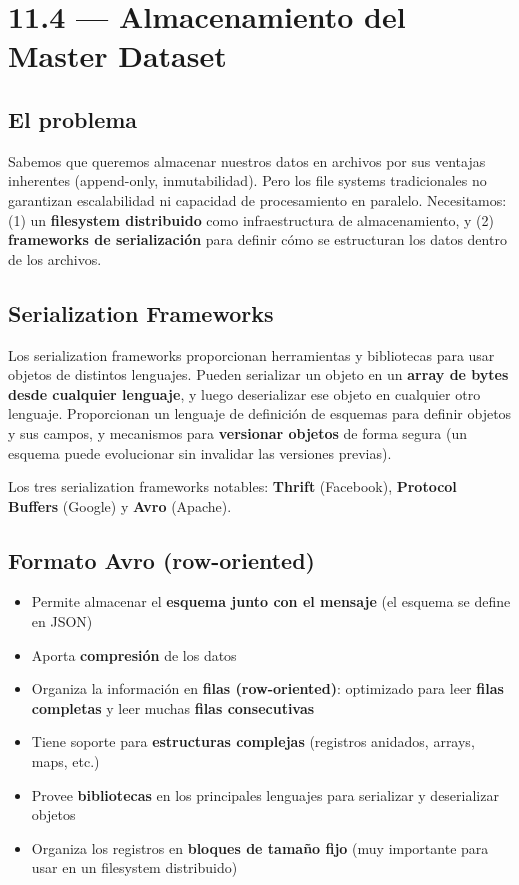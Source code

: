\documentclass[11pt, a4paper]{article}
\begin{document}
\section{11.4 — Almacenamiento del Master Dataset}

\subsection{El problema}

Sabemos que queremos almacenar nuestros datos en archivos por sus ventajas inherentes (append-only, inmutabilidad). Pero los file systems tradicionales no garantizan escalabilidad ni capacidad de procesamiento en paralelo. Necesitamos: (1) un \textbf{filesystem distribuido} como infraestructura de almacenamiento, y (2) \textbf{frameworks de serialización} para definir cómo se estructuran los datos dentro de los archivos.

\subsection{Serialization Frameworks}

Los serialization frameworks proporcionan herramientas y bibliotecas para usar objetos de distintos lenguajes. Pueden serializar un objeto en un \textbf{array de bytes desde cualquier lenguaje}, y luego deserializar ese objeto en cualquier otro lenguaje. Proporcionan un lenguaje de definición de esquemas para definir objetos y sus campos, y mecanismos para \textbf{versionar objetos} de forma segura (un esquema puede evolucionar sin invalidar las versiones previas).

Los tres serialization frameworks notables: \textbf{Thrift} (Facebook), \textbf{Protocol Buffers} (Google) y \textbf{Avro} (Apache).

\subsection{Formato Avro (row-oriented)}

\begin{itemize}
	\item Permite almacenar el \textbf{esquema junto con el mensaje} (el esquema se define en JSON)
	\item Aporta \textbf{compresión} de los datos
	\item Organiza la información en \textbf{filas (row-oriented)}: optimizado para leer \textbf{filas completas} y leer muchas \textbf{filas consecutivas}
	\item Tiene soporte para \textbf{estructuras complejas} (registros anidados, arrays, maps, etc.)
	\item Provee \textbf{bibliotecas} en los principales lenguajes para serializar y deserializar objetos
	\item Organiza los registros en \textbf{bloques de tamaño fijo} (muy importante para usar en un filesystem distribuido)
\end{itemize}
\end{document}
